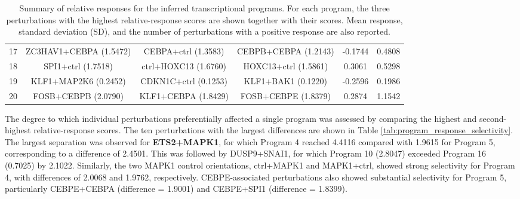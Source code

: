 \documentclass[11pt,a4paper]{article}
\begin{document}
\begin{table}[htbp]
{\begin{tabular*}{\linewidth}{@{\extracolsep{\fill}} cccc cc}
			17 & ZC3HAV1+CEBPA (1.5472) & CEBPA+ctrl (1.3583) & CEBPB+CEBPA (1.2143) & -0.1744 & 0.4808 \\
			18 & SPI1+ctrl (1.7518) & ctrl+HOXC13 (1.6760) & HOXC13+ctrl (1.5861) & 0.3061 & 0.5298 \\
			19 & KLF1+MAP2K6 (0.2452) & CDKN1C+ctrl (0.1253) & KLF1+BAK1 (0.1220) & -0.2596 & 0.1986 \\
			20 & FOSB+CEBPB (2.0790) & KLF1+CEBPA (1.8429) & FOSB+CEBPE (1.8379) & 0.2874 & 1.1542 \\
			\hline
		\end{tabular*}%
	}
	\caption{Summary of relative responses for the inferred transcriptional programs. For each program, the three perturbations with the highest relative-response scores are shown together with their scores. Mean response, standard deviation (SD), and the number of perturbations with a positive response are also reported.}
	\label{tab:program_relative_response_summary}
\end{table}

The degree to which individual perturbations preferentially affected a single program was assessed by comparing the highest and second-highest relative-response scores. The ten perturbations with the largest differences are shown in Table \ref{tab:program_response_selectivity}. The largest separation was observed for \textbf{ETS2+MAPK1}, for which Program 4 reached 4.4116 compared with 1.9615 for Program 5, corresponding to a difference of 2.4501. This was followed by DUSP9+SNAI1, for which Program 10 (2.8047) exceeded Program 16 (0.7025) by 2.1022. Similarly, the two MAPK1 control orientations, ctrl+MAPK1 and MAPK1+ctrl, showed strong selectivity for Program 4, with differences of 2.0068 and 1.9762, respectively. CEBPE-associated perturbations also showed substantial selectivity for Program 5, particularly CEBPE+CEBPA (difference = 1.9001) and CEBPE+SPI1 (difference = 1.8399).
\end{document}
